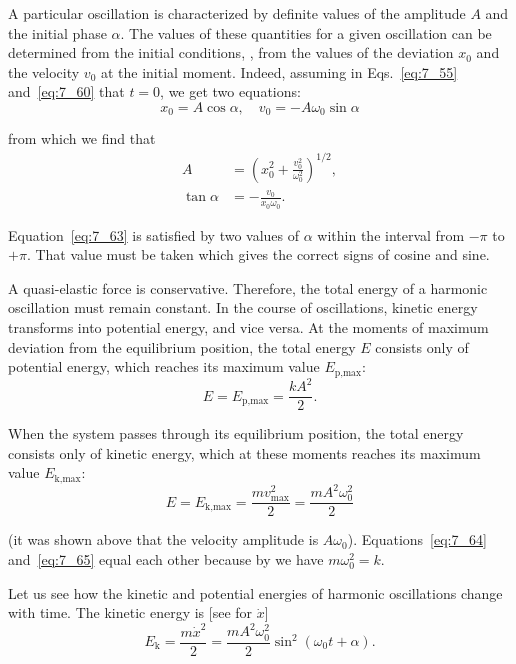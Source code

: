 A particular oscillation is characterized by definite values of the amplitude $A$ and the initial phase $\alpha$. The values of these quantities for a given oscillation can be determined from the initial conditions, \ie, from the values of the deviation $x_0$ and the velocity $v_0$ at the initial moment. Indeed, assuming in Eqs.~\eqref{eq:7_55} and~\eqref{eq:7_60} that $t=0$, we get two equations:
\begin{equation*}
	x_0 = A\cos\alpha,\quad v_0 = -A\omega_0\sin\alpha
\end{equation*}

\noindent
from which we find that
\begin{align}
	A &= \left(x_0^2 + \frac{v_0^2}{\omega_0^2}\right)^{1/2}, \label{eq:7_62}\\
	\tan\alpha &= -\frac{v_0}{x_0\omega_0}.\label{eq:7_63}
\end{align}

\noindent
Equation~\eqref{eq:7_63} is satisfied by two values of $\alpha$ within the interval from $-\pi$ to $+\pi$. That value must be taken which gives the correct signs of cosine and sine.

A quasi-elastic force is conservative. Therefore, the total energy of a harmonic oscillation must remain constant. In the course of oscillations, kinetic energy transforms into potential energy, and vice versa. At the moments of maximum deviation from the equilibrium position, the total energy $E$ consists only of potential energy, which reaches its maximum value $E_{\text{p,max}}$:
\begin{equation}\label{eq:7_64}
	E = E_{\text{p,max}} = \frac{kA^2}{2}.
\end{equation}

\noindent
When the system passes through its equilibrium position, the total energy consists only of kinetic energy, which at these moments reaches its maximum value $E_{\text{k,max}}$:
\vspace{-12pt}
\begin{equation}\label{eq:7_65}
	E = E_{\text{k,max}} = \frac{mv_{\text{max}}^2}{2} = \frac{mA^2\omega_0^2}{2}
\end{equation}

\noindent
(it was shown above that the velocity amplitude is $A\omega_0$). Equations~\eqref{eq:7_64} and~\eqref{eq:7_65} equal each other because by  we have $m\omega_0^2=k$.

Let us see how the kinetic and potential energies of harmonic oscillations change with time. The kinetic energy is [see  for $\dot{x}$]
\begin{equation}\label{eq:7_66}
	E_{\text{k}} = \frac{m\dot{x}^2}{2} = \frac{mA^2\omega_0^2}{2}\sin^2(\omega_0 t + \alpha).
\end{equation}

